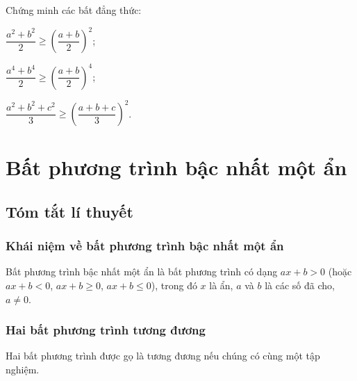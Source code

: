 \begin{bt}%
Chứng minh các bất đẳng thức:
\begin{listEX}[2]
\item $\dfrac{a^2+b^2}{2}\ge \left(\dfrac{a+b}{2}\right)^2$;
\item $\dfrac{a^4+b^4}{2}\ge \left(\dfrac{a+b}{2}\right)^4$;
\item $\dfrac{a^2+b^2+c^2}{3}\ge \left(\dfrac{a+b+c}{3}\right)^2$.
\end{listEX}
\end{bt}

\section{Bất phương trình bậc nhất một ẩn}
\subsection{Tóm tắt lí thuyết}
\subsubsection{Khái niệm về bất phương trình bậc nhất một ẩn}
Bất phương trình bậc nhất một ẩn là bất phương trình có dạng $ax+b>0$ (hoặc $ax+b<0$, $ax+b\ge 0$, $ax+b\le 0$), trong đó $x$ là ẩn, $a$ và $b$ là các số đã cho, $a\ne 0$.
\subsubsection{Hai bất phương trình tương đương}
Hai bất phương trình được gọ là tương đương nếu chúng có cùng một tập nghiệm.
